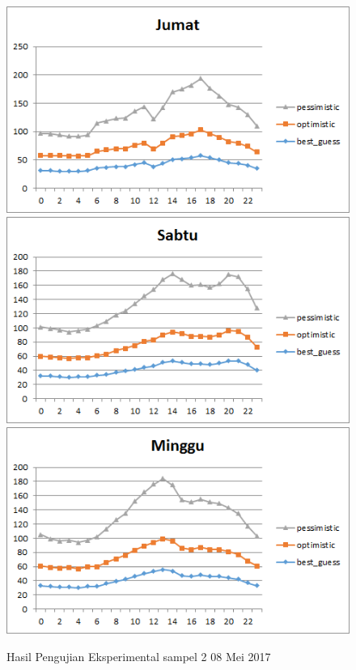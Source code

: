 			\begin{figure}[H]
				\centering		
				\includegraphics[]{Gambar/jumatsampel208052017.png}
				\includegraphics[]{Gambar/sabtusampel208052017.png}
				\includegraphics[]{Gambar/minggusampel208052017.png}
				\caption[Hasil Pengujian Eksperimental]{Hasil Pengujian Eksperimental sampel 2 08 Mei 2017}
				\label{fig:eksperimentalsampel208052017}
			\end{figure}	
			
